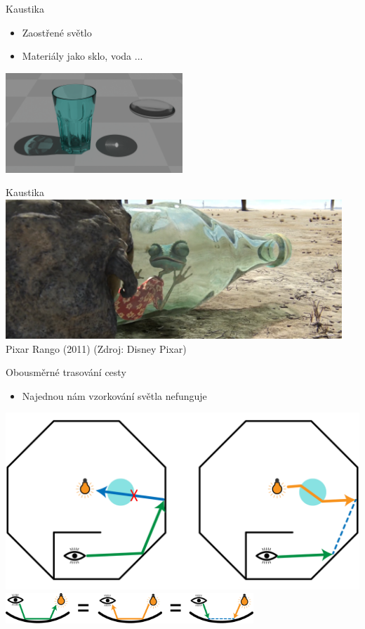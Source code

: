 \documentclass[czech]{beamer}
\begin{document}
\begin{frame}{Kaustika}
\begin{itemize}
  \item Zaostřené světlo
  \item Materiály jako sklo, voda ...
\end{itemize}
\vfill
\centering \includegraphics[width=0.5\textwidth]{img/caustics.png}
\end{frame}


\begin{frame}{Kaustika}
\centering \includegraphics[width=0.95\textwidth]{img/rango.png}
\vfill
Pixar Rango (2011) (Zdroj: Disney Pixar)
\end{frame}


\begin{frame}{Obousměrné trasování cesty}
\begin{itemize}
  \item Najednou nám vzorkování světla nefunguje
\end{itemize}
\vfill
\centering \includegraphics[width=0.8\linewidth]{img/bidirectional scene.png}
\vfill
\centering \includegraphics[width=0.7\textwidth]{img/bidirectional.png}
\end{frame}
\end{document}
